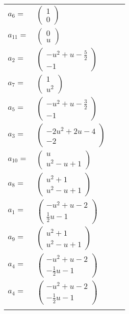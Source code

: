\documentclass[1p]{elsarticle_modified}
\theoremstyle{definition}
\begin{document}
\begin{tabular}{m{7pt} m{180pt} m{7pt} m{180pt} }
\flushright $a_{6}=$&$\begin{pmatrix}1\\0\end{pmatrix}$ \\
\flushright $a_{11}=$&$\begin{pmatrix}0\\u\end{pmatrix}$ \\
\flushright $a_{2}=$&$\begin{pmatrix}- u^2+u-\frac{5}{2}\\-1\end{pmatrix}$ \\
\flushright $a_{7}=$&$\begin{pmatrix}1\\u^2\end{pmatrix}$ \\
\flushright $a_{5}=$&$\begin{pmatrix}- u^2+u-\frac{3}{2}\\-1\end{pmatrix}$ \\
\flushright $a_{3}=$&$\begin{pmatrix}-2 u^2+2 u-4\\-2\end{pmatrix}$ \\
\flushright $a_{10}=$&$\begin{pmatrix}u\\u^2- u+1\end{pmatrix}$ \\
\flushright $a_{8}=$&$\begin{pmatrix}u^2+1\\u^2- u+1\end{pmatrix}$ \\
\flushright $a_{1}=$&$\begin{pmatrix}- u^2+u-2\\\frac{1}{2} u-1\end{pmatrix}$ \\
\flushright $a_{9}=$&$\begin{pmatrix}u^2+1\\u^2- u+1\end{pmatrix}$ \\
\flushright $a_{4}=$&$\begin{pmatrix}- u^2+u-2\\-\frac{1}{2} u-1\end{pmatrix}$\\ \flushright $a_{4}=$&$\begin{pmatrix}- u^2+u-2\\-\frac{1}{2} u-1\end{pmatrix}$\\&\end{tabular}
\end{document}
